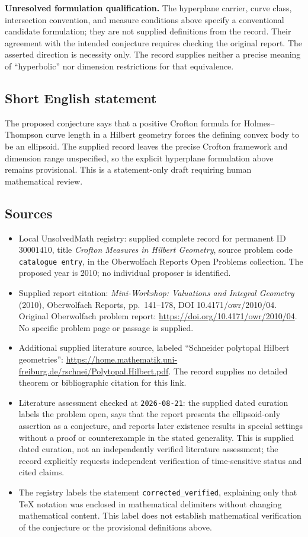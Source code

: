 \documentclass[11pt]{article}
\begin{document}
\textbf{Unresolved formulation qualification.} The hyperplane carrier, curve class, intersection convention, and measure conditions above specify a conventional candidate formulation; they are not supplied definitions from the record. Their agreement with the intended conjecture requires checking the original report. The asserted direction is necessity only. The record supplies neither a precise meaning of ``hyperbolic'' nor dimension restrictions for that equivalence.
\subsection{Short English statement}
The proposed conjecture says that a positive Crofton formula for Holmes--Thompson curve length in a Hilbert geometry forces the defining convex body to be an ellipsoid. The supplied record leaves the precise Crofton framework and dimension range unspecified, so the explicit hyperplane formulation above remains provisional. This is a statement-only draft requiring human mathematical review.
\subsection{Sources}
\begin{itemize}
\item Local UnsolvedMath registry: supplied complete record for permanent ID \(30001410\), title \emph{Crofton Measures in Hilbert Geometry}, source problem code \texttt{catalogue entry}, in the Oberwolfach Reports Open Problems collection. The proposed year is 2010; no individual proposer is identified.
\item Supplied report citation: \emph{Mini-Workshop: Valuations and Integral Geometry} (2010), Oberwolfach Reports, pp.~141--178, DOI 10.4171/owr/2010/04. Original Oberwolfach problem report: \url{https://doi.org/10.4171/owr/2010/04}. No specific problem page or passage is supplied.
\item Additional supplied literature source, labeled ``Schneider polytopal Hilbert geometries'': \url{https://home.mathematik.uni-freiburg.de/rschnei/Polytopal.Hilbert.pdf}. The record supplies no detailed theorem or bibliographic citation for this link.
\item Literature assessment checked at \texttt{2026-08-21}: the supplied dated curation labels the problem open, says that the report presents the ellipsoid-only assertion as a conjecture, and reports later existence results in special settings without a proof or counterexample in the stated generality. This is supplied dated curation, not an independently verified literature assessment; the record explicitly requests independent verification of time-sensitive status and cited claims.
\item The registry labels the statement \texttt{corrected\_verified}, explaining only that TeX notation was enclosed in mathematical delimiters without changing mathematical content. This label does not establish mathematical verification of the conjecture or the provisional definitions above.
\end{itemize}
\end{document}
